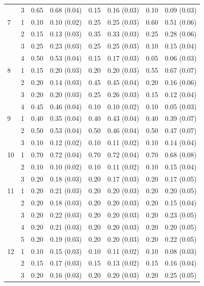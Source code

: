 \documentclass[11pt]{article}
\theoremstyle{plain}
\theoremstyle{definition}
\begin{document}
\begin{table}[H]
\begin{tabular}{llcccccc}
  & 3 & 0.65 & 0.68 (0.04) & 0.15 & 0.16  (0.03) & 0.10 & 0.09 (0.03)  \\
7 & 1 & 0.10 & 0.10 (0.02) & 0.25 & 0.25  (0.03) & 0.60 & 0.51 (0.06)  \\
  & 2 & 0.15 & 0.13 (0.03) & 0.35 & 0.33  (0.03) & 0.25 & 0.28 (0.06)   \\
  & 3 & 0.25 & 0.23 (0.03) & 0.25 & 0.25  (0.03) & 0.10 & 0.15 (0.04)   \\  
  & 4 & 0.50 & 0.53 (0.04) & 0.15 & 0.17  (0.03) & 0.05 & 0.06 (0.03)   \\
8 & 1 & 0.15 & 0.20 (0.03) & 0.20 & 0.20  (0.03) & 0.55 & 0.67 (0.07)  \\
  & 2 & 0.20 & 0.14 (0.03) & 0.45 & 0.45  (0.04) & 0.20 & 0.16 (0.06)   \\
  & 3 & 0.20 & 0.20 (0.03) & 0.25 & 0.26  (0.03) & 0.15 & 0.12 (0.04)  \\  
  & 4 & 0.45 & 0.46 (0.04) & 0.10 & 0.10  (0.02) & 0.10 & 0.05 (0.03)   \\
9 & 1 & 0.40 & 0.35 (0.04) & 0.40 & 0.43 (0.04) & 0.40 &  0.39 (0.07)   \\
  & 2 & 0.50 & 0.53 (0.04) & 0.50 & 0.46  (0.04) & 0.50 & 0.47 (0.07)   \\
  & 3 & 0.10 & 0.12 (0.02) & 0.10 & 0.11  (0.02) & 0.10 & 0.14 (0.04)   \\
10 & 1 & 0.70 & 0.72 (0.04) & 0.70 & 0.72  (0.04) & 0.70 & 0.68 (0.08)   \\
  & 2 & 0.10 & 0.10 (0.02) & 0.10 & 0.11 (0.02) & 0.10 & 0.15 (0.04)  \\
  & 3 & 0.20 & 0.18 (0.03) & 0.20 & 0.17 (0.03) & 0.20 & 0.17 (0.05)  \\
11 & 1 & 0.20 & 0.21 (0.03) & 0.20 & 0.20 (0.03) & 0.20 & 0.20 (0.05)  \\
  & 2 & 0.20 & 0.18 (0.03) & 0.20 & 0.20 (0.03) & 0.20 & 0.15 (0.04)  \\
  & 3 & 0.20 & 0.22 (0.03) & 0.20 & 0.20 (0.03) & 0.20 & 0.23 (0.05)  \\
  & 4 & 0.20 & 0.21 (0.03) & 0.20 & 0.20 (0.03) & 0.20 & 0.20 (0.05)   \\
  & 5 & 0.20 & 0.19 (0.03) & 0.20 & 0.20 (0.03) & 0.20 & 0.22 (0.05)  \\
12 & 1 & 0.10 & 0.15 (0.03) & 0.10 & 0.11 (0.02) & 0.10 & 0.08 (0.03) \\
  & 2 & 0.15 & 0.17 (0.03) & 0.15 & 0.13 (0.02) & 0.15 & 0.16 (0.04)  \\
  & 3 & 0.20 & 0.16 (0.03) & 0.20 & 0.20 (0.03) & 0.20 & 0.25 (0.05)  \\

\end{tabular}
\end{table}
\end{document}
